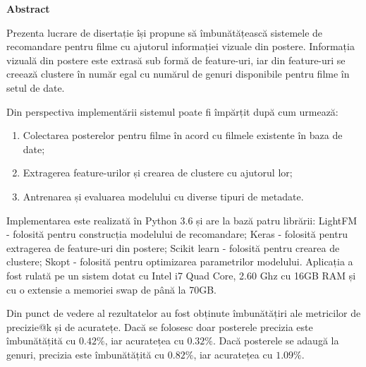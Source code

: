 \thispagestyle{plain}

\begin{center}
	\Large \textbf{Abstract}	
\end{center}

Prezenta lucrare de disertație își propune să îmbunătățească sistemele de recomandare pentru filme cu ajutorul informației vizuale din postere. Informația vizuală din postere este extrasă sub formă de feature-uri, iar din feature-uri se creează clustere în număr egal cu numărul de genuri disponibile pentru filme în setul de date.

\vspace{5mm}
Din perspectiva implementării sistemul poate fi împărțit după cum urmează:
\begin{enumerate}
	\item Colectarea posterelor pentru filme în acord cu filmele existente în baza de date;
	\item Extragerea feature-urilor și crearea de clustere cu ajutorul lor; 
	\item Antrenarea și evaluarea modelului cu diverse tipuri de metadate.
\end{enumerate}

Implementarea este realizată în Python 3.6 și are la bază patru librării: LightFM - folosită pentru construcția modelului de recomandare; Keras - folosită pentru extragerea de feature-uri din postere; Scikit learn - folosită pentru crearea de clustere; Skopt - folosită pentru optimizarea parametrilor modelului. Aplicația a fost rulată pe un sistem dotat cu Intel i7 Quad Core, 2.60 Ghz cu 16GB RAM și cu o extensie a memoriei swap de până la 70GB.

\vspace{5mm}
Din punct de vedere al rezultatelor au fost obținute îmbunătățiri ale metricilor de precizie@k și de acuratețe. Dacă se folosesc doar posterele precizia este îmbunătățită cu $0.42\%$, iar acuratețea cu $0.32\%$. Dacă posterele se adaugă la genuri, precizia este îmbunătățită cu $0.82\%$, iar acuratețea cu $1.09\%$.

\vspace*{\fill}
